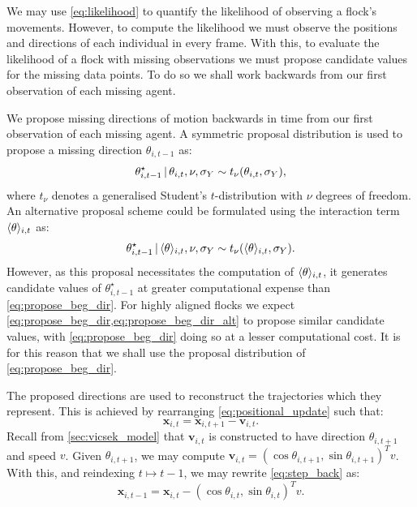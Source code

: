 We may use \cref{eq:likelihood} to quantify the likelihood of observing a
flock's movements. However, to compute the likelihood we must observe the
positions and directions of each individual in every frame. With this, to
evaluate the likelihood of a flock with missing observations we must propose
candidate values for the missing data points. To do so we shall work backwards
from our first observation of each missing agent.

We propose missing directions of motion backwards in time from our first
observation of each missing agent. A symmetric proposal distribution is used
to propose a missing direction $\theta_{i,t-1}$ as:
\begin{equation}
  \label{eq:propose_beg_dir}
  \theta_{i,t-1}^{\star} \,|\,  \theta_{i,t}, \nu, \sigma_Y
    \sim t_{\nu}(\theta_{i,t}, \sigma_Y),
\end{equation}
where $t_{\nu}$ denotes a generalised Student's $t$-distribution with $\nu$
degrees of freedom. An alternative proposal scheme could be formulated using
the interaction term $\langle\theta\rangle_{i,t}$ as:
\begin{equation}
  \label{eq:propose_beg_dir_alt}
  \theta_{i,t-1}^{\star} \,|\, \langle\theta\rangle_{i,t}, \nu, \sigma_Y
    \sim t_{\nu}(\langle\theta\rangle_{i,t}, \sigma_Y).
\end{equation}
However, as this proposal necessitates the computation of
$\langle\theta\rangle_{i,t}$, it generates candidate values of
$\theta_{i,t-1}^{\star}$ at greater computational expense than
\cref{eq:propose_beg_dir}. For highly aligned flocks we expect
\cref{eq:propose_beg_dir,eq:propose_beg_dir_alt} to propose similar candidate
values, with \cref{eq:propose_beg_dir} doing so at a lesser computational
cost. It is for this reason that we shall use the proposal distribution of
\cref{eq:propose_beg_dir}.

The proposed directions are used to reconstruct the trajectories which they
represent. This is achieved by rearranging \cref{eq:positional_update} such
that:
\begin{equation}
  \label{eq:step_back}
  \bm{x}_{i,t} = \bm{x}_{i,t+1} - \bm{v}_{i,t}.
\end{equation}
Recall from \cref{sec:vicsek_model} that $\bm{v}_{i,t}$ is constructed to have
direction $\theta_{i,t+1}$ and speed $v$. Given $\theta_{i,t+1}$, we may
compute $\bm{v}_{i,t} = (\cos\theta_{i,t+1}, \sin\theta_{i,t+1})^T v$. With
this, and reindexing $t\mapsto t-1$, we may rewrite \cref{eq:step_back} as:
\begin{equation}
  \label{eq:propose_beg_pos}
  \bm{x}_{i,t-1} = \bm{x}_{i,t} - (\cos\theta_{i,t}, \sin\theta_{i,t})^T v.
\end{equation}

